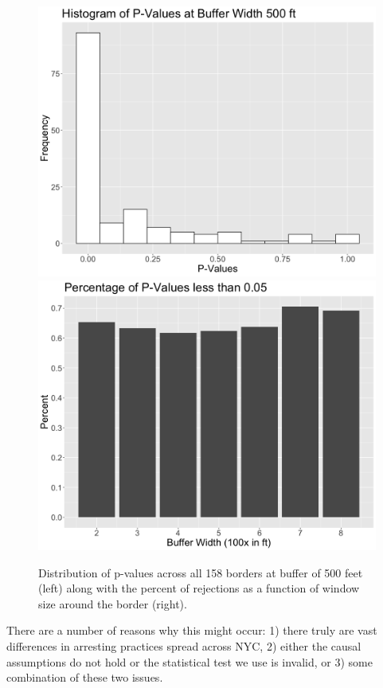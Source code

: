 \documentclass[a4paper,11pt]{article}
\begin{document}
\begin{figure}[h]
    \centering
    \includegraphics[scale=0.2]{plots/UnadjPVal500.png}
    \includegraphics[scale=0.2]{plots/NumRejectByBuffer.png}
        \caption{Distribution of p-values across all 158 borders at buffer of 500 feet (left) along with the percent of rejections as a function of window size around the border (right).}
    \label{fig:NaivePvalue}
\end{figure}
There are a number of reasons why this might occur: 1) there truly are vast differences in arresting practices spread across NYC, 2) either the causal assumptions do not hold or the statistical test we use is invalid, or 3) some combination of these two issues.
\end{document}
